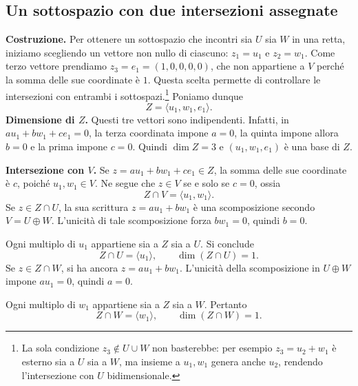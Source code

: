 \subsection{Un sottospazio con due intersezioni assegnate}
\begin{svolgimento}
\textbf{Costruzione.} Per ottenere un sottospazio che incontri sia $U$ sia $W$ in una retta, iniziamo scegliendo un vettore non nullo di ciascuno: $z_1=u_1$ e $z_2=w_1$. Come terzo vettore prendiamo $z_3=e_1=(1,0,0,0,0)$, che non appartiene a $V$ perché la somma delle sue coordinate è $1$. Questa scelta permette di controllare le intersezioni con entrambi i sottospazi.\footnote{La sola condizione $z_3\notin U\cup W$ non basterebbe: per esempio $z_3=u_2+w_1$ è esterno sia a $U$ sia a $W$, ma insieme a $u_1,w_1$ genera anche $u_2$, rendendo l'intersezione con $U$ bidimensionale.} Poniamo dunque
\[
  Z=\langle u_1,w_1,e_1\rangle.
\]
\textbf{Dimensione di $Z$.} Questi tre vettori sono indipendenti. Infatti, in $au_1+bw_1+ce_1=0$, la terza coordinata impone $a=0$, la quinta impone allora $b=0$ e la prima impone $c=0$. Quindi $\dim Z=3$ e $(u_1,w_1,e_1)$ è una base di $Z$.

\textbf{Intersezione con $V$.} Se $z=au_1+bw_1+ce_1\in Z$, la somma delle sue coordinate è $c$, poiché $u_1,w_1\in V$. Ne segue che $z\in V$ se e solo se $c=0$, ossia
\[
  Z\cap V=\langle u_1,w_1\rangle.
\]
 Se $z\in Z\cap U$, la sua scrittura $z=au_1+bw_1$ è una scomposizione secondo $V=U\oplus W$. L'unicità di tale scomposizione forza $bw_1=0$, quindi $b=0$.

 Ogni multiplo di $u_1$ appartiene sia a $Z$ sia a $U$. Si conclude
\[
  Z\cap U=\langle u_1\rangle,\qquad \dim(Z\cap U)=1.
\]
 Se $z\in Z\cap W$, si ha ancora $z=au_1+bw_1$. L’unicità della scomposizione in $U\oplus W$ impone $au_1=0$, quindi $a=0$.

 Ogni multiplo di $w_1$ appartiene sia a $Z$ sia a $W$. Pertanto
\[
  Z\cap W=\langle w_1\rangle,\qquad \dim(Z\cap W)=1.
\]
\end{svolgimento}

